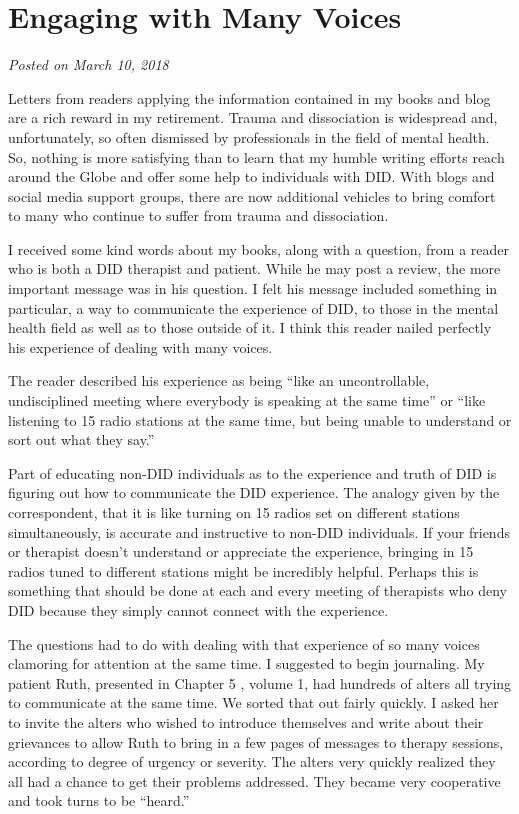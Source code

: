 \documentclass[]{book}
\begin{document}
\hypertarget{engaging-with-many-voices}{%
\section{Engaging with Many Voices}\label{engaging-with-many-voices}}

\emph{Posted on March 10, 2018}

Letters from readers applying the information contained in my books and blog are a rich reward in my retirement. Trauma and dissociation is widespread and, unfortunately, so often dismissed by professionals in the field of mental health. So, nothing is more satisfying than to learn that my humble writing efforts reach around the Globe and offer some help to individuals with DID. With blogs and social media support groups, there are now additional vehicles to bring comfort to many who continue to suffer from trauma and dissociation.

I received some kind words about my books, along with a question, from a reader who is both a DID therapist and patient. While he may post a review, the more important message was in his question. I felt his message included something in particular, a way to communicate the experience of DID, to those in the mental health field as well as to those outside of it. I think this reader nailed perfectly his experience of dealing with many voices.

The reader described his experience as being ``like an uncontrollable, undisciplined meeting where everybody is speaking at the same time'' or ``like listening to 15 radio stations at the same time, but being unable to understand or sort out what they say.''

Part of educating non-DID individuals as to the experience and truth of DID is figuring out how to communicate the DID experience. The analogy given by the correspondent, that it is like turning on 15 radios set on different stations simultaneously, is accurate and instructive to non-DID individuals. If your friends or therapist doesn't understand or appreciate the experience, bringing in 15 radios tuned to different stations might be incredibly helpful. Perhaps this is something that should be done at each and every meeting of therapists who deny DID because they simply cannot connect with the experience.

The questions had to do with dealing with that experience of so many voices clamoring for attention at the same time. I suggested to begin journaling. My patient Ruth, presented in Chapter 5 , volume 1, had hundreds of alters all trying to communicate at the same time. We sorted that out fairly quickly. I asked her to invite the alters who wished to introduce themselves and write about their grievances to allow Ruth to bring in a few pages of messages to therapy sessions, according to degree of urgency or severity. The alters very quickly realized they all had a chance to get their problems addressed. They became very cooperative and took turns to be ``heard.''
\end{document}
